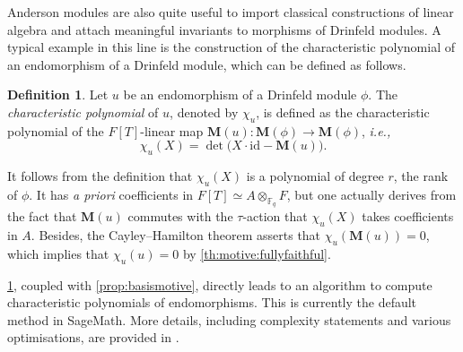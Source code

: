 \documentclass[11pt]{article}
\theoremstyle{definition}
\newtheorem{definition}[theorem]{Definition}
\newcommand\Fq{\mathbb{F}_q}
\newcommand{\MM}{\mathbf{M}}
\newcommand{\ie}{\textit{i.e.,~}}
\begin{document}
Anderson modules are also quite useful to import classical
constructions of linear algebra and attach meaningful invariants
to morphisms of Drinfeld modules.
A typical example in this line is the construction of the
characteristic polynomial of an endomorphism of a Drinfeld module,
which can be defined as follows.

\begin{definition}\label{def:charpoly}
  Let $u$ be an endomorphism of a Drinfeld module $\phi$.
  The \emph{characteristic polynomial} of $u$, denoted by $\chi_u$,
  is defined as the characteristic polynomial of the $F[T]$-linear
  map $\MM(u) : \MM(\phi) \to \MM(\phi)$, \ie
  $$\chi_u(X) = \det\big(X{\cdot}\text{id} - \MM(u)\big).$$
\end{definition}

It follows from the definition that $\chi_u(X)$ is a polynomial of
degree $r$, the rank of $\phi$. It has \emph{a priori} coefficients
in $F[T] \simeq A\otimes_{\Fq} F$, but one actually derives from the fact that $\MM(u)$ commutes with the $\tau$-action that $\chi_u(X)$ takes
coefficients in $A$. 
Besides, the Cayley--Hamilton theorem asserts that $\chi_u(\MM(u))=0$, 
which implies that $\chi_u(u) = 0$ by \cref{th:motive:fullyfaithful}.

\cref{def:charpoly}, coupled with \cref{prop:basismotive}, directly leads to
an algorithm to compute characteristic polynomials of endomorphisms.
This is currently the default method in SageMath.
More details, including complexity statements and various optimisations,
are provided in \cite{CL23}.
\end{document}
